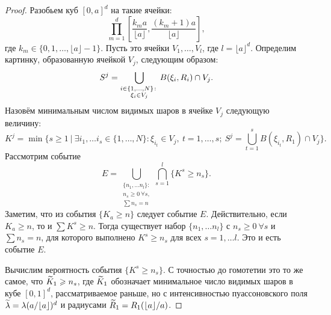 \begin{proof}
Разобьем куб $[0, a]^d$ на такие ячейки:
\begin{equation*}
    \prod_{m = 1}^d\left[\dfrac{k_m a}{\lfloor a \rfloor}, \dfrac{(k_m + 1)a}{\lfloor a \rfloor}\right],
\end{equation*}{}
где $k_m\in \{0, 1, \ldots, \lfloor a\rfloor - 1\}$. Пусть это ячейки $V_1, \ldots, V_l$, где $l = \lfloor a\rfloor ^d$. 
Определим картинку, образованную ячейкой $V_j$, следующим образом:
\begin{equation*}
    S^j = \bigcup\limits_{\substack{i\in \{1, \ldots, N\}\colon\\ \xi_i\in V_j}} B(\xi_i, R_i) \cap V_j.
\end{equation*}{}
Назовём минимальным числом видимых шаров в ячейке $V_j$ следующую величину:
\begin{equation*}
    K^j = \min\{s\geq 1\ |\ \exists i_1, \ldots i_s \in \{1, \ldots, N\} \colon \xi_{i_t}\in V_j,\ t = 1, \ldots, s;\ S^j = \bigcup_{t = 1}^s B(\xi_{i_t}, R_1)\cap V_j\}.
\end{equation*}{}
Рассмотрим событие
\begin{equation*}
    E = \bigcup_{\substack{\{n_1, \ldots n_l\}\colon\\ n_s \geq 0\ \forall s,\\ \sum n_s = n}} \bigcap_{s = 1}^l \{K^s \geq n_s\}.
\end{equation*}{}
Заметим, что из события $\{K_a \geq n\}$ следует событие $E$. Действительно, если $K_a \geq n$, то и $\sum K^s \geq n$. Тогда существует набор $\{n_1, \ldots n_l\}$ с $n_s \geq 0\ \forall s$ и $\sum n_s = n$, для которого выполнено $K^s \geq n_s$ для всех $s = 1, \ldots l$. Это и есть событие $E$.

Вычислим вероятность события $\{K^s \geq n_s\}$. 
С точностью до гомотетии это то же самое, что $\widetilde K_1 \geqslant n_s$, где $\widetilde K_1$ обозначает минимальное число видимых шаров в кубе $[0, 1]^d$, рассматриваемое раньше, но с интенсивностью пуассоновского поля $\widetilde\lambda = \lambda (a/\lfloor a\rfloor)^d$ и радиусами $\widetilde R_1 = R_1(\lfloor a\rfloor/a)$. 


\end{proof}
